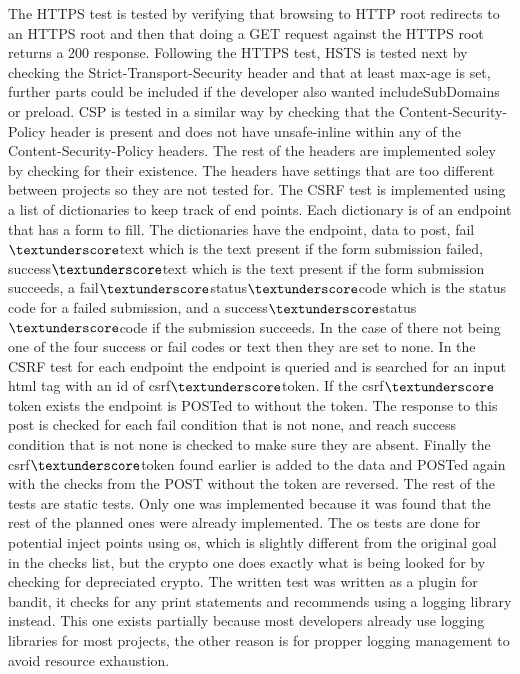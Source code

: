 The HTTPS test is tested by verifying that browsing to HTTP root redirects to an HTTPS root and then that doing a GET request against the HTTPS root returns a 200 response. Following the HTTPS test,
HSTS is tested next by checking the Strict-Transport-Security header and that at least max-age is set, further parts could be included if the developer also wanted includeSubDomains or preload. CSP
is tested in a similar way by checking that the Content-Security-Policy header is present and does not have unsafe-inline within any of the Content-Security-Policy headers. The rest of the headers
are implemented soley by checking for their existence. The headers have settings that are too different between projects so they are not tested for. The CSRF test is implemented using a list of
dictionaries to keep track of end points. Each dictionary is of an endpoint that has a form to fill. The dictionaries have the endpoint, data to post, fail$\textunderscore$text which is the text
present if the form submission failed, success$\textunderscore$text which is the text present if the form submission succeeds, a fail$\textunderscore$status$\textunderscore$code which is the status
code for a failed submission, and a success$\textunderscore$status$\textunderscore$code if the submission succeeds. In the case of there not being one of the four success or fail codes or text then
they are set to none. In the CSRF test for each endpoint the endpoint is queried and is searched for an input html tag with an id of csrf$\textunderscore$token. If the csrf$\textunderscore$token
exists the endpoint is POSTed to without the token. The response to this post is checked for each fail condition that is not none, and reach success condition that is not none is checked to make sure
they are absent. Finally the csrf$\textunderscore$token found earlier is added to the data and POSTed again with the checks from the POST without the token are reversed. The rest of the tests are
static tests. Only one was implemented because it was found that the rest of the planned ones were already implemented. The os tests are done for potential inject points using os, which is slightly
different from the original goal in the checks list, but the crypto one does exactly what is being looked for by checking for depreciated crypto. The written test was written as a plugin for bandit,
it checks for any print statements and recommends using a logging library instead. This one exists partially because most developers already use logging libraries for most projects, the other reason
is for propper logging management to avoid resource exhaustion.

